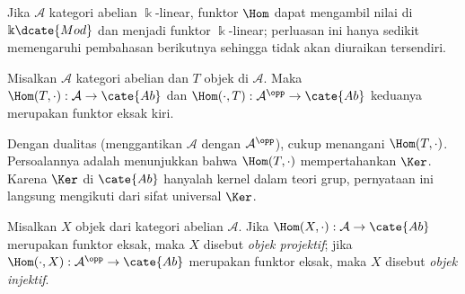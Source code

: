 Jika $\mathcal{A}$ kategori abelian $\Bbbk$-linear, funktor $\Hom$ dapat mengambil
nilai di $\Bbbk\dcate{Mod}$ dan menjadi funktor $\Bbbk$-linear; perluasan ini
hanya sedikit memengaruhi pembahasan berikutnya sehingga tidak akan diuraikan tersendiri.

\begin{proposisi}\label{prop:Hom-left-exact}
Misalkan $\mathcal{A}$ kategori abelian dan $T$ objek di $\mathcal{A}$. Maka
$\Hom(T,\cdot):\mathcal{A}\to\cate{Ab}$ dan
$\Hom(\cdot,T):\mathcal{A}^{\opp}\to\cate{Ab}$ keduanya merupakan funktor eksak kiri.
\end{proposisi}

\begin{bukti}
Dengan dualitas (menggantikan $\mathcal{A}$ dengan $\mathcal{A}^{\opp}$), cukup
menangani $\Hom(T,\cdot)$. Persoalannya adalah menunjukkan bahwa
$\Hom(T,\cdot)$ mempertahankan $\Ker$. Karena $\Ker$ di $\cate{Ab}$ hanyalah
kernel dalam teori grup, pernyataan ini langsung mengikuti dari sifat universal
$\Ker$.
\end{bukti}

\begin{definisi}\label{def:injective-projective-obj}
Misalkan $X$ objek dari kategori abelian $\mathcal{A}$. Jika
$\Hom(X,\cdot):\mathcal{A}\to\cate{Ab}$ merupakan funktor eksak, maka $X$
disebut \emph{objek projektif}; jika
$\Hom(\cdot,X):\mathcal{A}^{\opp}\to\cate{Ab}$ merupakan funktor eksak, maka $X$
disebut \emph{objek injektif}.
\end{definisi}

